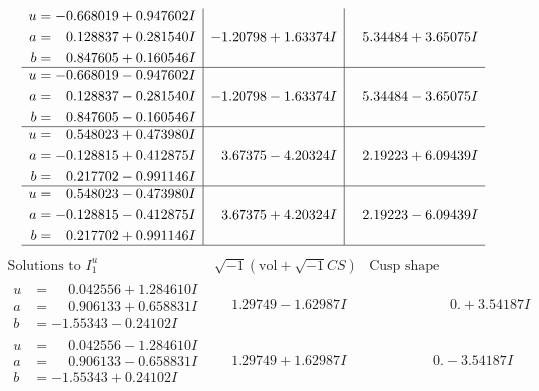 \documentclass[1p]{elsarticle_modified}
\theoremstyle{definition}
\newcommand{\I}{\sqrt{-1}}
\begin{document}
$$\begin{array}{c|c|c}
\begin{aligned}
u &= -0.668019 + 0.947602 I \\
a &= \phantom{-}0.128837 + 0.281540 I \\
b &= \phantom{-}0.847605 + 0.160546 I\end{aligned}
 & -1.20798 + 1.63374 I & \phantom{-}5.34484 + 3.65075 I \\ \hline\begin{aligned}
u &= -0.668019 - 0.947602 I \\
a &= \phantom{-}0.128837 - 0.281540 I \\
b &= \phantom{-}0.847605 - 0.160546 I\end{aligned}
 & -1.20798 - 1.63374 I & \phantom{-}5.34484 - 3.65075 I \\ \hline\begin{aligned}
u &= \phantom{-}0.548023 + 0.473980 I \\
a &= -0.128815 + 0.412875 I \\
b &= \phantom{-}0.217702 - 0.991146 I\end{aligned}
 & \phantom{-}3.67375 - 4.20324 I & \phantom{-}2.19223 + 6.09439 I \\ \hline\begin{aligned}
u &= \phantom{-}0.548023 - 0.473980 I \\
a &= -0.128815 - 0.412875 I \\
b &= \phantom{-}0.217702 + 0.991146 I\end{aligned}
 & \phantom{-}3.67375 + 4.20324 I & \phantom{-}2.19223 - 6.09439 I\\
 \hline 
 \end{array}$$\newpage$$\begin{array}{c|c|c}  
\text{Solutions to }I^u_{1}& \I (\text{vol} + \sqrt{-1}CS) & \text{Cusp shape}\\
 \hline 
\begin{aligned}
u &= \phantom{-}0.042556 + 1.284610 I \\
a &= \phantom{-}0.906133 + 0.658831 I \\
b &= -1.55343 - 0.24102 I\end{aligned}
 & \phantom{-}1.29749 - 1.62987 I & \phantom{-0.000000 -}0. + 3.54187 I \\ \hline\begin{aligned}
u &= \phantom{-}0.042556 - 1.284610 I \\
a &= \phantom{-}0.906133 - 0.658831 I \\
b &= -1.55343 + 0.24102 I\end{aligned}
 & \phantom{-}1.29749 + 1.62987 I & \phantom{-0.000000 } 0. - 3.54187 I \\ \hline\begin{aligned}

\end{aligned}
\end{array}$$
\end{document}
